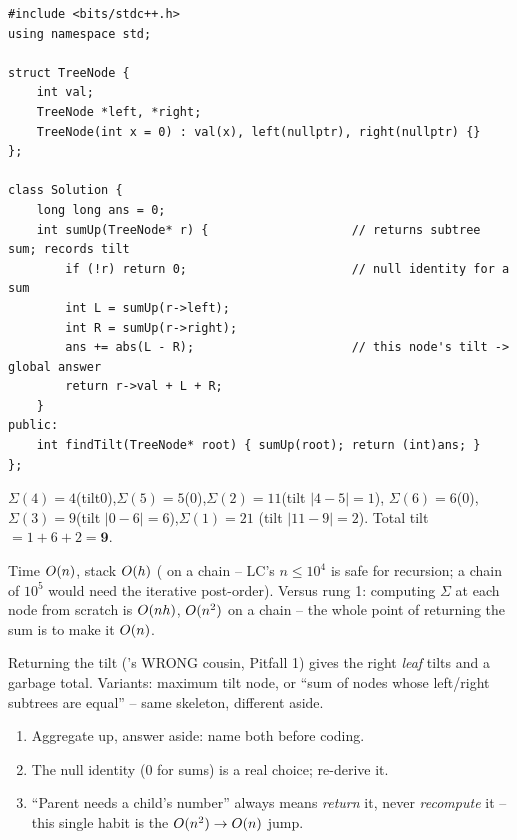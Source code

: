 \begin{lstlisting}[caption={Binary Tree Tilt (LeetCode 563)}, label={lst:c02-tilt}]
#include <bits/stdc++.h>
using namespace std;

struct TreeNode {
    int val;
    TreeNode *left, *right;
    TreeNode(int x = 0) : val(x), left(nullptr), right(nullptr) {}
};

class Solution {
    long long ans = 0;
    int sumUp(TreeNode* r) {                    // returns subtree sum; records tilt
        if (!r) return 0;                       // null identity for a sum
        int L = sumUp(r->left);
        int R = sumUp(r->right);
        ans += abs(L - R);                      // this node's tilt -> global answer
        return r->val + L + R;
    }
public:
    int findTilt(TreeNode* root) { sumUp(root); return (int)ans; }
};
\end{lstlisting}

\begin{tracebox}
$\Sigma(4){=}4$(tilt0),$\Sigma(5){=}5$(0),$\Sigma(2){=}11$(tilt $|4{-}5|{=}1$),
$\Sigma(6){=}6$(0),$\Sigma(3){=}9$(tilt $|0{-}6|{=}6$),$\Sigma(1){=}21$
(tilt $|11{-}9|{=}2$). Total tilt $=1+6+2=\mathbf{9}$.
\end{tracebox}

\begin{complexitybox}
Time $O(n)$, stack $O(h)$ ( on a chain -- LC's $n\le10^{4}$ is
safe for recursion; a chain of $10^{5}$ would need the iterative post-order).
Versus rung 1: computing $\Sigma$ at each node from scratch is $O(nh)$,
$O(n^2)$ on a chain -- the whole point of returning the sum is to make it
$O(n)$.
\end{complexitybox}

\begin{warningbox}
Returning the tilt ('s WRONG cousin, Pitfall 1) gives the
right \emph{leaf} tilts and a garbage total. Variants: maximum tilt node, or
``sum of nodes whose left/right subtrees are equal'' -- same skeleton, different
aside.
\end{warningbox}

\begin{insightbox}
\begin{enumerate}[nosep, leftmargin=1.6em]
  \item Aggregate up, answer aside: name both before coding.
  \item The null identity ($0$ for sums) is a real choice; re-derive it.
  \item ``Parent needs a child's number'' always means \emph{return} it, never
        \emph{recompute} it -- this single habit is the $O(n^2)\to O(n)$
        jump.
\end{enumerate}
\end{insightbox}

